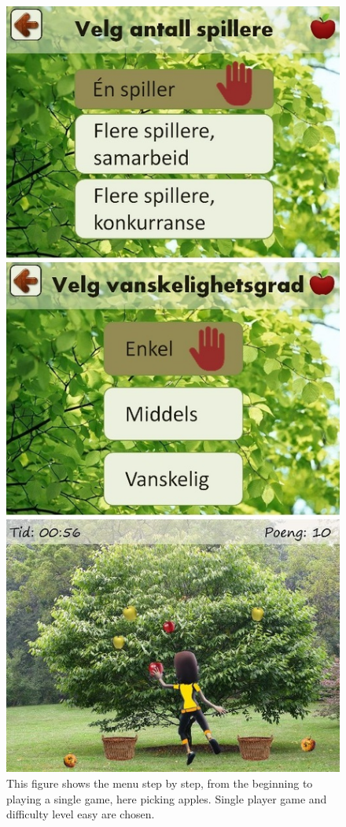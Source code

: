 \begin{figure} [ht!]
\centering
\includegraphics[scale=0.5]{menuStep2.jpg}
\caption[The menu, part two]{This figure shows the menu step by step, from the beginning to playing a single game, here picking apples. Single player game and difficulty level easy are chosen.}
\label{menu2}
\end{figure}